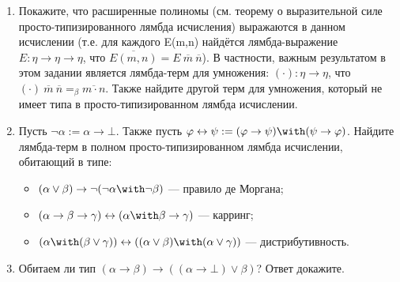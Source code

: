 \documentclass[10pt,a4paper,oneside]{article}
\begin{document}
\begin{enumerate}
\item Покажите, что расширенные полиномы (см. теорему о выразительной силе просто-типизированного лямбда исчисления)
выражаются в данном исчислении (т.е. для каждого E(m,n) найдётся лямбда-выражение $E: \eta\rightarrow\eta\rightarrow\eta$,
что $\overline{E(m,n)} = E\ \overline{m}\ \overline{n}$). 
В частности, важным результатом в этом задании является лямбда-терм для умножения:
$(\cdot): \eta\rightarrow\eta$, что $(\cdot)\ \overline{m}\ \overline{n} =_\beta \overline{m\cdot n}$.
Также найдите другой терм для умножения, который не имеет типа в просто-типизированном лямбда исчислении.

\item Пусть $\neg\alpha := \alpha\rightarrow\bot$. Также пусть $\varphi\leftrightarrow\psi := (\varphi\rightarrow\psi)\with(\psi\rightarrow\varphi)$.
Найдите лямбда-терм в полном просто-типизированном лямбда исчислении, обитающий в типе:
\begin{itemize}
\item $(\alpha\vee\beta)\rightarrow\neg(\neg\alpha\with\neg\beta)$ --- правило де Моргана;
\item $(\alpha\rightarrow\beta\rightarrow\gamma) \leftrightarrow (\alpha\with\beta\rightarrow\gamma)$ --- карринг;
\item $(\alpha\with(\beta\vee\gamma)) \leftrightarrow ((\alpha\vee\beta)\with(\alpha\vee\gamma))$ --- дистрибутивность.
\end{itemize}

\item Обитаем ли тип $(\alpha\rightarrow\beta)\rightarrow((\alpha\rightarrow\bot)\vee\beta)$? Ответ докажите.
\end{enumerate}
\end{document}
